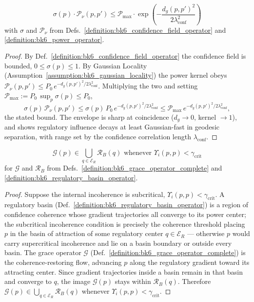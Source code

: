 \begin{theorem}
\label{theorem:bk6_confidence_power_bound}
\begin{equation}
\sigma(p) \cdot \mathcal{P}_\nu(p, p') \leq \mathcal{P}_{\max} \cdot \exp\left(-\frac{d_g(p,p')^2}{2\lambda_{\text{conf}}^2}\right)
\end{equation}
with \(\sigma\) and \(\mathcal{P}_\nu\) from Defs.~\ref{definition:bk6_confidence_field_operator} and \ref{definition:bk6_power_operator}.
\end{theorem}
\begin{proof}
\label{proof:bk6_confidence_power_bound}
\leavevmode
By Def.~\ref{definition:bk6_confidence_field_operator} the confidence field is bounded, $0\le\sigma(p)\le 1$. By Gaussian Locality (Assumption~\ref{assumption:bk6_gaussian_locality}) the power kernel obeys $\mathcal{P}_\nu(p,p')\le P_0\,e^{-d_g(p,p')^2/2\lambda_{\text{conf}}^2}$. Multiplying the two and setting $\mathcal{P}_{\max}:=P_0\,\sup_p\sigma(p)\le P_0$,
\[
\sigma(p)\,\mathcal{P}_\nu(p,p')\le\sigma(p)\,P_0\,e^{-d_g(p,p')^2/2\lambda_{\text{conf}}^2}\le\mathcal{P}_{\max}\,e^{-d_g(p,p')^2/2\lambda_{\text{conf}}^2},
\]
the stated bound. The envelope is sharp at coincidence ($d_g\to 0$, kernel $\to 1$), and shows regulatory influence decays at least Gaussian-fast in geodesic separation, with range set by the confidence correlation length $\lambda_{\text{conf}}$.
\end{proof}

\begin{lemma}
\label{lemma:bk6_grace_basin_correspondence}
\begin{equation}
\mathcal{G}(p) \in \bigcup_{q \in \mathcal{E}_R} \mathcal{R}_B(q) \text{ whenever } \Upsilon_i(p,p) < \gamma_{\text{crit}}
\end{equation}
for \(\mathcal{G}\) and \(\mathcal{R}_B\) from Defs.~\ref{definition:bk6_grace_operator_complete} and \ref{definition:bk6_regulatory_basin_operator}.
\end{lemma}
\begin{proof}
\label{proof:bk6_grace_basin_correspondence}
\leavevmode
Suppose the internal incoherence is subcritical, $\Upsilon_i(p,p)<\gamma_{\text{crit}}$. A regulatory basin (Def.~\ref{definition:bk6_regulatory_basin_operator}) is a region of confidence coherence whose gradient trajectories all converge to its power center; the subcritical incoherence condition is precisely the coherence threshold placing $p$ in the basin of attraction of some regulatory center $q\in\mathcal{E}_R$ --- otherwise $p$ would carry supercritical incoherence and lie on a basin boundary or outside every basin. The grace operator $\mathcal{G}$ (Def.~\ref{definition:bk6_grace_operator_complete}) is the coherence-restoring flow, advancing $p$ along the regulatory gradient toward its attracting center. Since gradient trajectories inside a basin remain in that basin and converge to $q$, the image $\mathcal{G}(p)$ stays within $\mathcal{R}_B(q)$. Therefore $\mathcal{G}(p)\in\bigcup_{q\in\mathcal{E}_R}\mathcal{R}_B(q)$ whenever $\Upsilon_i(p,p)<\gamma_{\text{crit}}$.
\end{proof}


